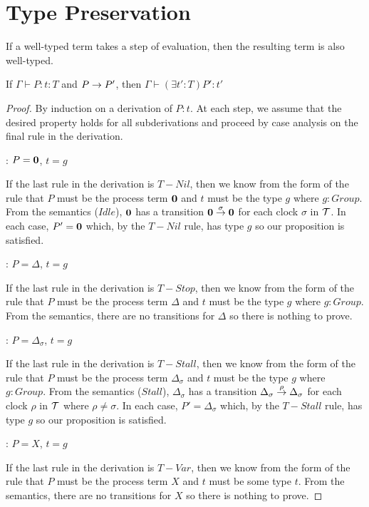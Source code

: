 \chapter{Type Preservation}

If a well-typed term takes a step of evaluation, then the resulting
term is also well-typed.

\begin{proposition}
If $\Gamma \vdash P : t : T$ and $P \stackrel{}{\rightarrow} P'$, then $\Gamma \vdash (\exists t' : T) P' : t'$
\end{proposition}

\begin{proof}
By induction on a derivation of $P:t$.  At each step, we assume that
the desired property holds for all subderivations and proceed by case
analysis on the final rule in the derivation.

: $P = \textbf{0}$, $t = g$

\noindent If the last rule in the derivation is $T-Nil$, then we know
from the form of the rule that $P$ must be the process term $\textbf{0}$ and
$t$ must be the type $g$ where $g : Group$.  From the semantics
($Idle$), $\textbf{0}$ has a transition $\textbf{0} \stackrel{\sigma}{\rightarrow} \textbf{0}$ for
each clock $\sigma$ in $\text{$\mathcal{T}$}$.  In each case, $P' = \textbf{0}$ which, by
the $T-Nil$ rule, has type $g$ so our proposition is satisfied.

: $P = \Delta$, $t = g$

\noindent If the last rule in the derivation is $T-Stop$, then we know
from the form of the rule that $P$ must be the process term $\Delta$
and $t$ must be the type $g$ where $g : Group$.  From the semantics,
there are no transitions for $\Delta$ so there is nothing to prove.

: $P = \Delta_\sigma$, $t = g$

\noindent If the last rule in the derivation is $T-Stall$, then we know
from the form of the rule that $P$ must be the process term
$\Delta_\sigma$ and $t$ must be the type $g$ where $g : Group$.  From
the semantics ($Stall$), $\Delta_\sigma$ has a transition
$\Delta_\sigma \stackrel{\rho}{\rightarrow} \Delta_\sigma$ for each clock $\rho$ in
$\text{$\mathcal{T}$}$ where $\rho \ne \sigma$.  In each case, $P' = \Delta_\sigma$
which, by the $T-Stall$ rule, has type $g$ so our proposition is
satisfied.

: $P = X$, $t = g$

\noindent If the last rule in the derivation is $T-Var$, then we know
from the form of the rule that $P$ must be the process term $X$ and
$t$ must be some type $t$.  From the semantics, there are no
transitions for $X$ so there is nothing to prove.


\end{proof}
